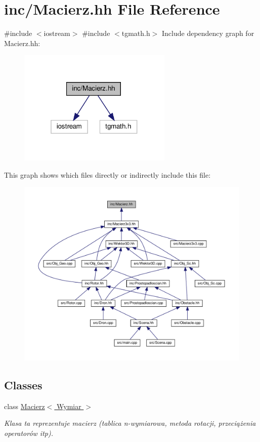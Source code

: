 \hypertarget{_macierz_8hh}{}\section{inc/\+Macierz.hh File Reference}
\label{_macierz_8hh}
{\ttfamily \#include $<$iostream$>$}\newline
{\ttfamily \#include $<$tgmath.\+h$>$}\newline
Include dependency graph for Macierz.\+hh\+:\nopagebreak
\begin{figure}[H]
\begin{center}
\leavevmode
\includegraphics[width=208pt]{_macierz_8hh__incl}
\end{center}
\end{figure}
This graph shows which files directly or indirectly include this file\+:
\nopagebreak
\begin{figure}[H]
\begin{center}
\leavevmode
\includegraphics[width=350pt]{_macierz_8hh__dep__incl}
\end{center}
\end{figure}
\subsection*{Classes}
\begin{DoxyCompactItemize}
\item 
class \hyperlink{class_macierz}{Macierz$<$ Wymiar $>$}
\begin{DoxyCompactList}\small\item\em Klasa ta reprezentuje macierz (tablica n-\/wymiarowa, metoda rotacji, przeciążenia operatorów itp). \end{DoxyCompactList}\end{DoxyCompactItemize}
